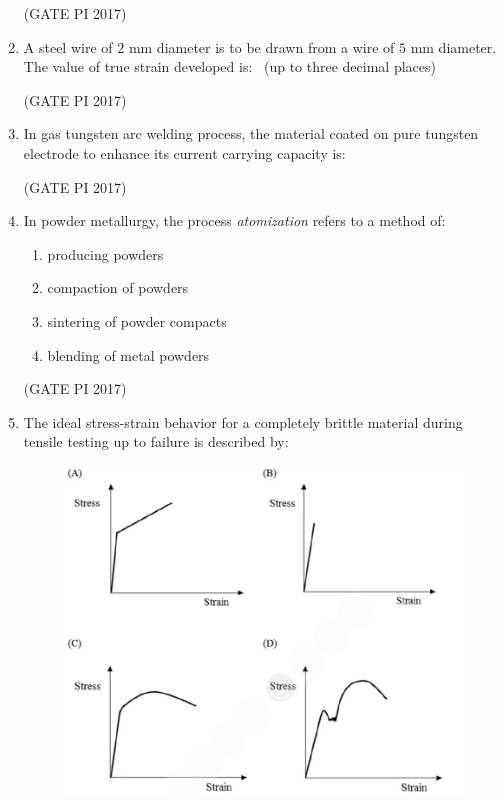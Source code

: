 \documentclass[journal,12pt,onecolumn]{IEEEtran}
\theoremstyle{remark}
\begin{document}
\begin{enumerate}
\hfill (GATE PI 2017)

\item A steel wire of $2$ mm diameter is to be drawn from a wire of $5$ mm diameter.  
The value of true strain developed is:  
\underline{\hspace{3cm}} \ (up to three decimal places)  

\hfill (GATE PI 2017)

\item In gas tungsten arc welding process, the material coated on pure tungsten electrode  
to enhance its current carrying capacity is:
\begin{enumerate}
\end{enumerate}

\hfill (GATE PI 2017)

\item In powder metallurgy, the process \textit{atomization} refers to a method of:
\begin{enumerate}
\item producing powders
\item compaction of powders
\item sintering of powder compacts
\item blending of metal powders
\end{enumerate}

\hfill (GATE PI 2017)

\item The ideal stress\--strain behavior for a completely brittle material during tensile testing up to failure is described by:
\begin{figure}[h]
    \centering
    \includegraphics[width=1\columnwidth]{fig2.png}
    \caption{}
    \label{fig:placeholder}
\end{figure}


\end{enumerate}
\end{document}
